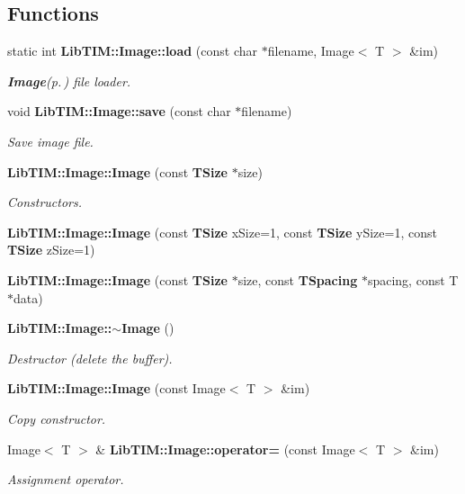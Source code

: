 \subsection*{Functions}
\begin{CompactItemize}
\item 
static int {\bf Lib\-TIM::Image::load} (const char $\ast$filename, Image$<$ T $>$ \&im)
\begin{CompactList}\small\item\em {\bf Image}{\rm (p.\,\pageref{classLibTIM_1_1Image})} file loader. \item\end{CompactList}\item 
void {\bf Lib\-TIM::Image::save} (const char $\ast$filename)
\begin{CompactList}\small\item\em Save image file. \item\end{CompactList}\item 
{\bf Lib\-TIM::Image::Image} (const {\bf TSize} $\ast$size)
\begin{CompactList}\small\item\em Constructors. \item\end{CompactList}\item 
{\bf Lib\-TIM::Image::Image} (const {\bf TSize} x\-Size=1, const {\bf TSize} y\-Size=1, const {\bf TSize} z\-Size=1)
\item 
{\bf Lib\-TIM::Image::Image} (const {\bf TSize} $\ast$size, const {\bf TSpacing} $\ast$spacing, const T $\ast$data)
\item 
{\bf Lib\-TIM::Image::$\sim$Image} ()
\begin{CompactList}\small\item\em Destructor (delete the buffer). \item\end{CompactList}\item 
{\bf Lib\-TIM::Image::Image} (const Image$<$ T $>$ \&im)
\begin{CompactList}\small\item\em Copy constructor. \item\end{CompactList}\item 
Image$<$ T $>$ \& {\bf Lib\-TIM::Image::operator=} (const Image$<$ T $>$ \&im)
\begin{CompactList}\small\item\em Assignment operator. \item\end{CompactList}\item 

\end{CompactItemize}
